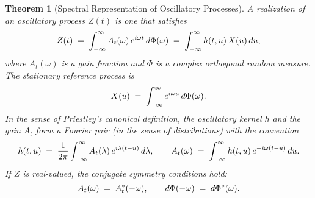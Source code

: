 \documentclass{article}
\newtheorem{theorem}{Theorem}
\begin{document}
\begin{theorem}[Spectral Representation of Oscillatory Processes]
  A realization of an oscillatory process $Z (t)$ is one that satisfies
  \begin{equation}
    \label{eq:osc-rep} Z (t) \hspace{0.27em} = \hspace{0.27em} \int_{-
    \infty}^{\infty} A_t (\omega)  \hspace{0.17em} e^{i \omega t} 
    \hspace{0.17em} d \Phi (\omega) \hspace{0.27em} = \hspace{0.27em} \int_{-
    \infty}^{\infty} h (t, u)  \hspace{0.17em} X (u)  \hspace{0.17em} du,
  \end{equation}
  where $A_t (\omega)$ is a gain function and $\Phi$ is a complex orthogonal
  random measure. The stationary reference process is
  \begin{equation}
    \label{eq:X-stationary} X (u) \hspace{0.27em} = \hspace{0.27em} \int_{-
    \infty}^{\infty} e^{i \omega u}  \hspace{0.17em} d \Phi (\omega) .
  \end{equation}
  In the sense of Priestley's canonical definition, the oscillatory kernel $h$
  and the gain $A_t$ form a Fourier pair (in the sense of distributions) with
  the convention
  \begin{equation}
    \label{eq:h-A-pair} h (t, u) \hspace{0.27em} = \hspace{0.27em} \frac{1}{2
    \pi}  \int_{- \infty}^{\infty} A_t (\lambda)  \hspace{0.17em} e^{i \lambda
    (t - u)}  \hspace{0.17em} d \lambda, \qquad A_t (\omega) \hspace{0.27em} =
    \hspace{0.27em} \int_{- \infty}^{\infty} h (t, u)  \hspace{0.17em} e^{- i
    \omega (t - u)}  \hspace{0.17em} du.
  \end{equation}
  If $Z$ is real-valued, the conjugate symmetry conditions hold:
  \begin{equation}
    \label{eq:real-sym} A_t (\omega) \hspace{0.27em} = \hspace{0.27em}
    A_t^{\ast}  (- \omega), \qquad d \Phi (- \omega) \hspace{0.27em} =
    \hspace{0.27em} d \Phi^{\ast} (\omega) .
  \end{equation}
\end{theorem}
\end{document}
